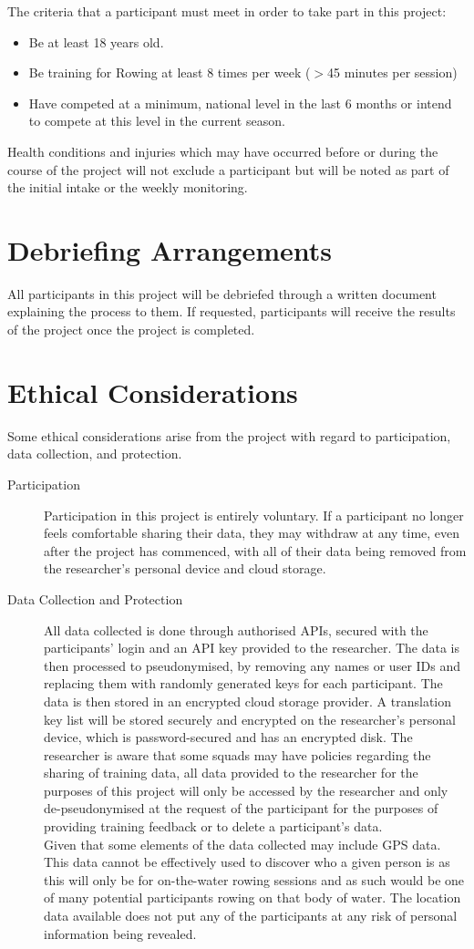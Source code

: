 The criteria that a participant must meet in order to take part in this project:
\begin{itemize}
    \item Be at least 18 years old.
    \item Be training for Rowing at least 8 times per week ($>$45 minutes per session)
    \item Have competed at a minimum, national level in the last 6 months or intend to compete at this level in the current season.
\end{itemize}
Health conditions and injuries which may have occurred before or during the course of the project will not exclude a participant but will be noted as part of the initial intake or the weekly monitoring.

\section*{Debriefing Arrangements}
All participants in this project will be debriefed through a written document explaining the process to them. If requested, participants will receive the results of the project once the project is completed.
\section*{Ethical Considerations}
Some ethical considerations arise from the project with regard to participation, data collection, and protection.
\begin{description}
    \item [Participation] Participation in this project is entirely voluntary. If a participant no longer feels comfortable sharing their data, they may withdraw at any time, even after the project has commenced, with all of their data being removed from the researcher's personal device and cloud storage.
    \item [Data Collection and Protection] All data collected is done through authorised APIs, secured with the participants' login and an API key provided to the researcher. The data is then processed to pseudonymised, by removing any names or user IDs and replacing them with randomly generated keys for each participant. The data is then stored in an encrypted cloud storage provider. A translation key list will be stored securely and encrypted on the researcher's personal device, which is password-secured and has an encrypted disk. The researcher is aware that some squads may have policies regarding the sharing of training data, all data provided to the researcher for the purposes of this project will only be accessed by the researcher and only de-pseudonymised at the request of the participant for the purposes of providing training feedback or to delete a participant's data. \\
    Given that some elements of the data collected may include GPS data. This data cannot be effectively used to discover who a given person is as this will only be for on-the-water rowing sessions and as such would be one of many potential participants rowing on that body of water. The location data available does not put any of the participants at any risk of personal information being revealed.
\end{description}
